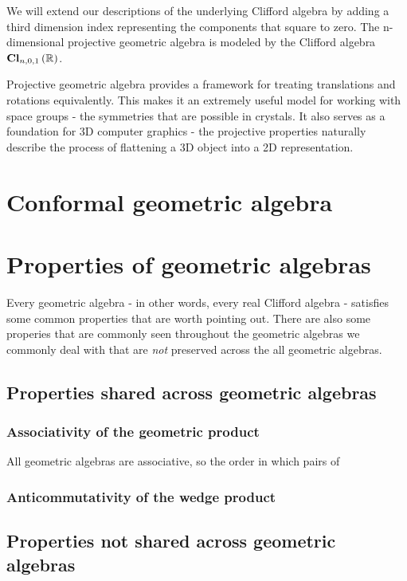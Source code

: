 We will extend our descriptions of the underlying Clifford algebra by adding a third dimension index
representing the components that square to zero. The n-dimensional projective geometric algebra is
modeled by the Clifford algebra $\operatorname{\mathbf{Cl}}_{n,0,1}\left(\mathbb{R}\right)$.

Projective geometric algebra provides a framework for treating translations and rotations
equivalently. This makes it an extremely useful model for working with space groups - the symmetries
that are possible in crystals. It also serves as a foundation for 3D computer graphics - the
projective properties naturally describe the process of flattening a 3D object into a 2D
representation.

\section{Conformal geometric algebra}

\section{Properties of geometric algebras}

Every geometric algebra - in other words, every real Clifford algebra - satisfies some common
properties that are worth pointing out. There are also some properies that are commonly seen
throughout the geometric algebras we commonly deal with that are \textit{not} preserved across the
all geometric algebras.

\subsection{Properties shared across geometric algebras}

\subsubsection{Associativity of the geometric product}

All geometric algebras are associative, so the order in which pairs of 

\subsubsection{Anticommutativity of the wedge product}

\subsection{Properties not shared across geometric algebras}

